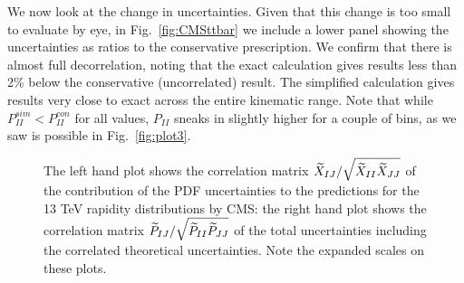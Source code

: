 We now look at the change in uncertainties. Given that this change is too small to evaluate by eye, in Fig.~\ref{fig:CMSttbar} we include a lower panel showing the uncertainties as ratios to the conservative prescription. We confirm that there is almost full decorrelation, noting that the exact calculation gives results less than 2\% below the conservative (uncorrelated) result. The simplified calculation gives results very close to exact across the entire kinematic range. Note that while $P_{II}^{sim} < P_{II}^{con}$ for all values, $P_{II}$ sneaks in slightly higher for a couple of bins, as we saw is possible in Fig.~\ref{fig:plot3}.
\begin{figure}[t]
    \begin{center}
    \end{center}
  \vspace{-0.55cm}
  \caption{The left hand plot shows the correlation matrix $\widetilde{X}_{IJ}/\sqrt{\widetilde{X}_{II}\widetilde{X}_{JJ}}$ of the contribution of the PDF uncertainties to the predictions for the 13 TeV rapidity distributions by CMS: the right hand plot shows the correlation matrix $\widetilde{P}_{IJ}/\sqrt{\widetilde{P}_{II}\widetilde{P}_{JJ}}$ of the total uncertainties including the correlated theoretical uncertainties. Note the expanded scales on these plots.} 
  \label{fig:CMSttbarcorrlns}
\end{figure}

